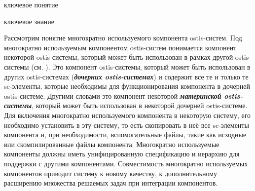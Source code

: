 \begin{SCn}
	\begin{scnrelfromlist}{ключевое понятие}
	\end{scnrelfromlist}
\end{SCn}

\bigskip

\begin{SCn}
	\begin{scnrelfromlist}{ключевое знание}
	\end{scnrelfromlist}
\end{SCn}

Рассмотрим понятие многократно используемого компонента ostis-систем. Под многократно используемым компонентом ostis-систем понимается  компонент некоторой ostis-системы, который может быть использован в рамках другой ostis-системы (см. ). Это компонент ostis-системы, который может быть использован в других ostis-системах (\textbf{\textit{дочерних ostis-системах}}) и содержит все те и только те sc-элементы, которые необходимы для функционирования компонента в дочерней ostis-системе. Другими словами это компонент некоторой \textbf{\textit{материнской ostis-системы}}, который может быть использован в некоторой дочерней ostis-системе. Для включения многократно используемого компонента в некоторую систему, его необходимо установить в эту систему, то есть скопировать в неё все sc-элементы компонента и, при необходимости, вспомогательные файлы, такие как исходные или скомпилированные файлы компонента. Многократно используемые компоненты должны иметь унифицированную спецификацию и иерархию для поддержки  с другими компонентами. Совместимость многократно используемых компонентов приводит систему к новому качеству, к дополнительному расширению множества решаемых задач при интеграции компонентов.

\begin{SCn}
\end{SCn}

